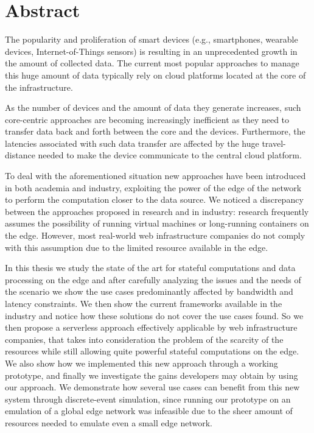 \chapter*{Abstract}

The popularity and proliferation of smart devices (e.g., smartphones, wearable devices, Internet-of-Things sensors) is resulting in an unprecedented growth in the amount of collected data. The current most popular approaches to manage this huge amount of data typically rely on cloud platforms located at the core of the infrastructure.

As the number of devices and the amount of data they generate increases, such core-centric approaches are becoming increasingly inefficient as they need to transfer data back and forth between the core and the devices. Furthermore, the latencies associated with such data transfer are affected by the huge travel-distance needed to make the device communicate to the central cloud platform.

To deal with the aforementioned situation new approaches have been introduced in both academia and industry, exploiting the power of the edge of the network to perform the computation closer to the data source. We noticed a discrepancy between the approaches proposed in research and in industry: research frequently assumes the possibility of running virtual machines or long-running containers on the edge. However, most real-world web infrastructure companies do not comply with this assumption due to the limited resource available in the edge.

In this thesis we study the state of the art for stateful computations and data processing on the edge and after carefully analyzing the issues and the needs of the scenario we show the use cases predominantly affected by bandwidth and latency constraints. We then show the current frameworks available in the industry and notice how these solutions do not cover the use cases found. So we then propose a serverless approach effectively applicable by web infrastructure companies, that takes into consideration the problem of the scarcity of the resources while still allowing quite powerful stateful computations on the edge. We also show how we implemented this new approach through a working prototype, and finally we investigate the gains developers may obtain by using our approach. We demonstrate how several use cases can benefit from this new system through discrete-event simulation, since running our prototype on an emulation of a global edge network was infeasible due to the sheer amount of resources needed to emulate even a small edge network.

